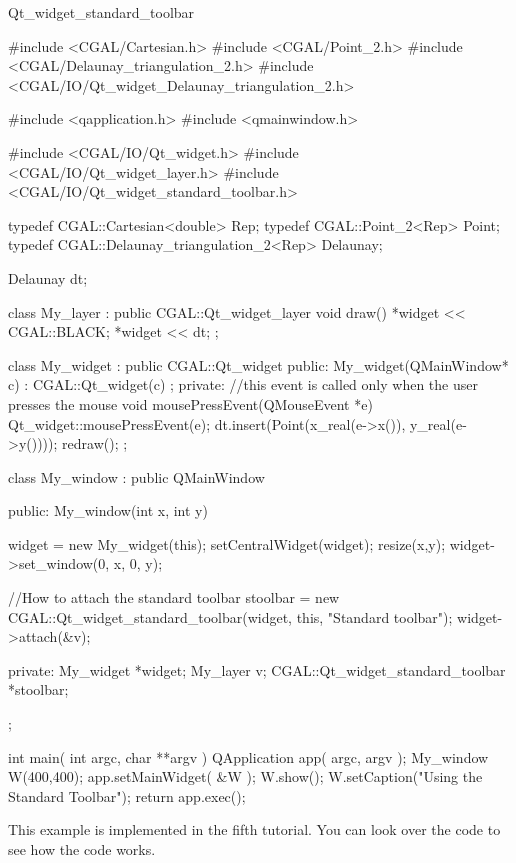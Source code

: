 \begin{ccRefClass}{Qt_widget_standard_toolbar}
\ccExample
\begin{ccExampleCode}
#include <CGAL/Cartesian.h>
#include <CGAL/Point_2.h>
#include <CGAL/Delaunay_triangulation_2.h>
#include <CGAL/IO/Qt_widget_Delaunay_triangulation_2.h>

#include <qapplication.h>
#include <qmainwindow.h>

#include <CGAL/IO/Qt_widget.h>
#include <CGAL/IO/Qt_widget_layer.h>
#include <CGAL/IO/Qt_widget_standard_toolbar.h>

typedef CGAL::Cartesian<double>		    Rep;
typedef CGAL::Point_2<Rep>		    Point;
typedef CGAL::Delaunay_triangulation_2<Rep> Delaunay;

Delaunay dt;

class My_layer : public CGAL::Qt_widget_layer{
  void draw(){
    *widget << CGAL::BLACK;
    *widget << dt;
  }
};

class My_widget : public CGAL::Qt_widget {
public:
  My_widget(QMainWindow* c) : CGAL::Qt_widget(c) {};
private:
  //this event is called only when the user presses the mouse
  void mousePressEvent(QMouseEvent *e)
  {
    Qt_widget::mousePressEvent(e);
    dt.insert(Point(x_real(e->x()), y_real(e->y())));
    redraw();
  }
};

class My_window : public QMainWindow{
public:
  My_window(int x, int y)
  {
    widget = new My_widget(this);
    setCentralWidget(widget);
    resize(x,y);
    widget->set_window(0, x, 0, y);
    
    //How to attach the standard toolbar
    stoolbar = new CGAL::Qt_widget_standard_toolbar(widget, this,
						    "Standard toolbar");
    widget->attach(&v);
  }
private:
  My_widget *widget;
  My_layer  v;
  CGAL::Qt_widget_standard_toolbar *stoolbar;
};

int main( int argc, char **argv )
{
    QApplication app( argc, argv );
    My_window W(400,400);
    app.setMainWidget( &W );
    W.show();
    W.setCaption("Using the Standard Toolbar");
    return app.exec();
}
\end{ccExampleCode}

This example is implemented in the fifth tutorial. You can 
look over the code to see how the code works.

\end{ccRefClass}








